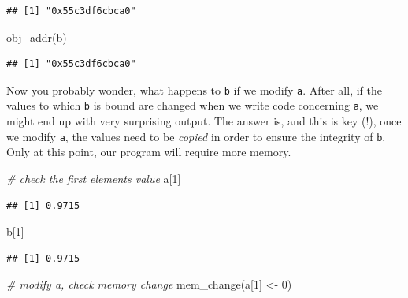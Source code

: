 \documentclass[
  12pt,
]{style/krantz}
\newenvironment{Shaded}{\begin{snugshade}}{\end{snugshade}}
\newcommand{\CommentTok}[1]{\textcolor[rgb]{0.56,0.35,0.01}{\textit{#1}}}
\newcommand{\DecValTok}[1]{\textcolor[rgb]{0.00,0.00,0.81}{#1}}
\newcommand{\FunctionTok}[1]{\textcolor[rgb]{0.00,0.00,0.00}{#1}}
\newcommand{\NormalTok}[1]{#1}
\newcommand{\OtherTok}[1]{\textcolor[rgb]{0.56,0.35,0.01}{#1}}
\begin{document}
\begin{verbatim}
## [1] "0x55c3df6cbca0"
\end{verbatim}

\begin{Shaded}
\begin{Highlighting}[]
\FunctionTok{obj\_addr}\NormalTok{(b)}
\end{Highlighting}
\end{Shaded}

\begin{verbatim}
## [1] "0x55c3df6cbca0"
\end{verbatim}

Now you probably wonder, what happens to \texttt{b} if we modify \texttt{a}. After all, if the values to which \texttt{b} is bound are changed when we write code concerning \texttt{a}, we might end up with very surprising output. The answer is, and this is key (!), once we modify \texttt{a}, the values need to be \emph{copied} in order to ensure the integrity of \texttt{b}. Only at this point, our program will require more memory.

\begin{Shaded}
\begin{Highlighting}[]
\CommentTok{\# check the first element\textquotesingle{}s value}
\NormalTok{a[}\DecValTok{1}\NormalTok{]}
\end{Highlighting}
\end{Shaded}

\begin{verbatim}
## [1] 0.9715
\end{verbatim}

\begin{Shaded}
\begin{Highlighting}[]
\NormalTok{b[}\DecValTok{1}\NormalTok{]}
\end{Highlighting}
\end{Shaded}

\begin{verbatim}
## [1] 0.9715
\end{verbatim}

\begin{Shaded}
\begin{Highlighting}[]
\CommentTok{\# modify a, check memory change}
\FunctionTok{mem\_change}\NormalTok{(a[}\DecValTok{1}\NormalTok{] }\OtherTok{\textless{}{-}} \DecValTok{0}\NormalTok{)}
\end{Highlighting}
\end{Shaded}
\end{document}
